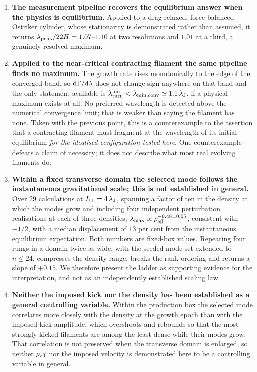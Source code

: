 \documentclass[usenatbib,twoside,twocolumn]{mnras}
\begin{document}
\begin{enumerate}\setlength{\itemsep}{2pt}
\item \textbf{The measurement pipeline recovers the equilibrium answer when the physics is equilibrium.} Applied to a drag-relaxed, force-balanced Ostriker cylinder, whose stationarity is demonstrated rather than assumed, it returns $\lambda_{\rm peak}/22H=1.07$--$1.10$ at two resolutions and $1.01$ at a third, a genuinely resolved maximum.
\item \textbf{Applied to the near-critical contracting filament the same pipeline finds no maximum.} The growth rate rises monotonically to the edge of the converged band, so ${\rm d}\Gamma/{\rm d}\lambda$ does not change sign anywhere on that band and the only statement available is $\lambda_{\rm turn}^{\rm lim}<\lambda_{\rm min,conv}\simeq1.1\,\lambda_{\rm J}$, if a physical maximum exists at all. No preferred wavelength is detected above the numerical convergence limit; that is weaker than saying the filament has none. Taken with the previous point, this is a counterexample to the assertion that a contracting filament must fragment at the wavelength of its initial equilibrium \emph{for the idealised configuration tested here}. One counterexample defeats a claim of necessity; it does not describe what most real evolving filaments do.
\item \textbf{Within a fixed transverse domain the selected mode follows the instantaneous gravitational scale; this is not established in general.} Over $29$ calculations at $L_\perp=4\,\lambda_{\rm J}$, spanning a factor of ten in the density at which the modes grow and including four independent perturbation realisations at each of three densities, $\lambda_{\rm max}\propto\rho_{\rm eff}^{-0.48\pm0.05}$, consistent with $-1/2$, with a median displacement of $13$ per cent from the instantaneous equilibrium expectation. Both numbers are fixed-box values. Repeating four rungs in a domain twice as wide, with the seeded mode set extended to $n\leq24$, compresses the density range, breaks the rank ordering and returns a slope of $+0.15$. We therefore present the ladder as supporting evidence for the interpretation, and not as an independently established scaling law.
\item \textbf{Neither the imposed kick nor the density has been established as a general controlling variable.} Within the production box the selected mode correlates more closely with the density at the growth epoch than with the imposed kick amplitude, which overshoots and rebounds so that the most strongly kicked filaments are among the least dense while their modes grow. That correlation is not preserved when the transverse domain is enlarged, so neither $\rho_{\rm eff}$ nor the imposed velocity is demonstrated here to be a controlling variable in general.

\end{enumerate}
\end{document}
